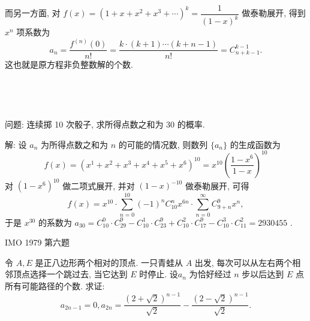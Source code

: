 而另一方面, 对 $ f(x) = (1+x+x^2+x^3+\cdots)^k = \dfrac{1}{(1-x)^k}$ 做泰勒展开, 得到 $x^n$ 项系数为
\[
a_n = \frac{f^{(n)}(0)}{n!} = \frac{k\cdot(k+1)\cdots(k+n-1)}{n!} = C^{k-1}_{n+k-1}.
\]
这也就是原方程非负整数解的个数.

~

~

问题: 连续掷 10 次骰子, 求所得点数之和为 30 的概率.

解: 设 $a_n$ 为所得点数之和为 $n$ 的可能的情况数, 则数列 $\{a_n\}$ 的生成函数为
\[
f(x) = (x^1+x^2+x^3+x^4+x^5+x^6)^{10} = x^{10}\left(\frac{1-x^6}{1-x}\right)^{10}
\]
对 $(1-x^6)^{10}$ 做二项式展开, 并对 $(1-x)^{-10}$ 做泰勒展开, 可得
\[
f(x) = x^{10}\cdot\sum_{n=0}^{10}{(-1)^nC_{10}^nx^{6n}} \cdot \sum_{n=0}^{\infty}{C_{9+n}^9x^n},
\]
于是 $x^{30}$ 的系数为 $a_{30} = C_{10}^0\cdot C_{29}^9 - C_{10}^1\cdot C_{23}^9 + C_{10}^2\cdot C_{17}^9 - C_{10}^3\cdot C_{11}^2 = 2930455$ .


\newpage
\noindent IMO 1979 第六题

令 $A,E$ 是正八边形两个相对的顶点. 一只青蛙从 $A$ 出发, 每次可以从左右两个相邻顶点选择一个跳过去, 当它达到 $E$ 时停止. $设 a_n$ 为恰好经过 $n$ 步以后达到 $E$ 点所有可能路径的个数. 求证:
\[a_{2n-1} = 0, a_{2n} = \frac{(2+\sqrt{2})^{n-1}}{\sqrt{2}} - \frac{(2-\sqrt{2})^{n-1}}{\sqrt{2}} .\]
\begin{figure*}[htbp]
\centering
{}
\end{figure*}

